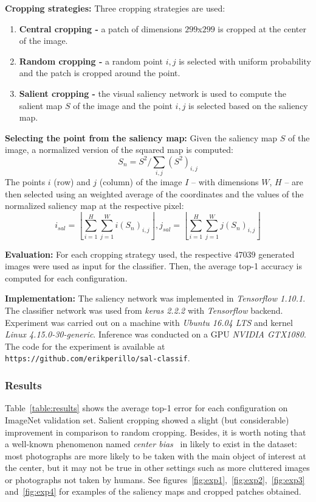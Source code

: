 \documentclass[12pt]{article}
\begin{document}
\textbf{Cropping strategies:}
Three cropping strategies are used:
\begin{enumerate}
    \item \textbf{Central cropping -} a patch of dimensions $299$x$299$ is cropped at the center of the image.
    \item \textbf{Random cropping -} a random point $i, j$ is selected with uniform probability and the
        patch is cropped around the point.
    \item \textbf{Salient cropping -}
        the visual saliency network is used to compute the salient map $S$ of the image
        and the point $i, j$ is selected based on the saliency map.
\end{enumerate}

\textbf{Selecting the point from the saliency map:}
Given the saliency map $S$ of the image, a normalized version of the squared map is computed:
$$S_n = S^2/\sum\limits_{i,j}\left({S^2}\right)_{i,j}$$
The points $i$ (row) and $j$ (column) of the image $I$ -- with dimensions $W$, $H$ --
are then selected using an weighted average of the coordinates and the values of the normalized saliency map
at the respective pixel:
$$i_{sal} = \left\lfloor \sum\limits_{i=1}^H\sum\limits_{j=1}^W i\left(S_n\right)_{i,j} \right\rfloor,
  j_{sal} = \left\lfloor \sum\limits_{i=1}^H\sum\limits_{j=1}^W j\left(S_n\right)_{i,j} \right\rfloor$$

\textbf{Evaluation:}
For each cropping strategy used, the respective $47039$ generated images were used as input for the classifier.
Then, the average top-1 accuracy is computed for each configuration.

\textbf{Implementation:}
The saliency network was implemented in \emph{Tensorflow 1.10.1}.
The classifier network was used from \emph{keras 2.2.2} with \emph{Tensorflow} backend.
Experiment was carried out on a machine with \emph{Ubuntu 16.04 LTS} and kernel \emph{Linux 4.15.0-30-generic}.
Inference was conducted on a GPU \emph{NVIDIA GTX1080}.
The code for the experiment is available at \texttt{https://github.com/erikperillo/sal-classif}.

\subsubsection{Results}
Table~\ref{table:results} shows the average top-1 error for each configuration on ImageNet validation set.
Salient cropping showed a slight (but considerable) improvement in comparison to random cropping.
Besides, it is worth noting that a well-known phenomenon named \emph{center bias}~\cite{ref:centerbias}
in likely to exist in
the dataset: most photographs are more likely to be taken with the main object of interest at the center,
but it may not be true in other settings such as more cluttered images or photographs not taken by humans.
See figures~\ref{fig:exp1},~\ref{fig:exp2},~\ref{fig:exp3} and~\ref{fig:exp4}
for examples of the saliency maps and cropped patches obtained.
\end{document}
